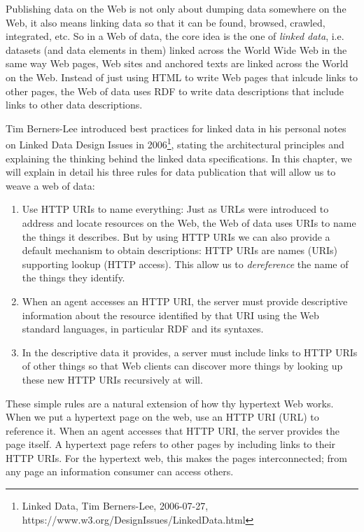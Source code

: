 Publishing data on the Web is not only about dumping data somewhere on
the Web, it also means linking data so that it can be found, browsed,
crawled, integrated, etc. So in a Web of data, the core idea is the one
of \emph{linked data}, i.e. datasets (and data elements in them)  linked across the
World Wide Web in the same way Web pages, Web sites and anchored texts
are linked across the World on the Web. Instead of just
using HTML to write Web pages that inlcude links to other pages, the Web of
data uses RDF to write data descriptions that include links to other data
descriptions.

Tim Berners-Lee introduced best practices for linked data in his
personal notes on Linked Data Design Issues in 2006\footnote{Linked
  Data, Tim Berners-Lee, 2006-07-27,
  https://www.w3.org/DesignIssues/LinkedData.html}, stating the
architectural principles and explaining the thinking behind the linked data
specifications.   In this chapter, we will explain in detail his three rules 
for data publication that will allow us to weave a web of data:



\begin{enumerate}
\def\labelenumi{\arabic{enumi}.}
\item
\label{ruleURI}
  Use HTTP URIs to name everything: Just as URLs were introduced to
  address and locate resources on the Web, the Web of data uses URIs to
  name the things it describes. But by using HTTP URIs we can also
  provide a default mechanism to obtain descriptions: HTTP URIs are
  names (URIs) supporting lookup (HTTP access). This allow us to
  \textit{dereference} the name of the things they identify.
\item
\label{ruleFYN}
  When an agent accesses an HTTP URI, the server must provide descriptive
  information about the resource identified by that URI using the Web
  standard languages, in particular RDF and its syntaxes.
\item
\label{ruleLink}
  In the descriptive data it provides, a server must include links to
  HTTP URIs of other things so that Web clients can discover more things
  by looking up these new HTTP URIs recursively at will.
\end{enumerate}

These simple rules are a natural extension of how thy hypertext Web works. When we put a hypertext page 
on the web, use an HTTP URI (URL) to reference it.  When an agent accesses that HTTP URI, the server provides 
the page itself.  A hypertext page refers to other pages by including links to their HTTP URIs. 
For the hypertext web, this makes the pages interconnected; from any page an 
information consumer can access others.

